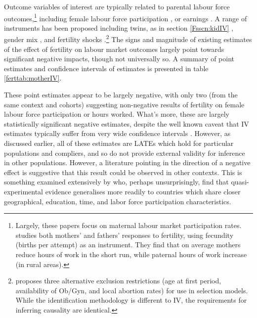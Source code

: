 Outcome variables of interest are typically related to parental labour 
force outcomes,\footnote{Largely, these papers focus on maternal labour
market participation rates. \citet{KimAassve2006} studies both mothers' and
fathers' responses to fertility, using fecundity (births per attempt) as an
instrument.  They find that on average mothers reduce hours of work in the short 
run, while paternal hours of work increase (in rural areas).} including female 
labour force participation \citep{AgueroMarks2008,AgueroMarks2011,ChunOh2002,
Caceres2008,AngristEvans1998}, or earnings \citep{Caceres2006,Hotzetal1997,
Jacobsenetal1999}.  A range of instruments has been proposed including twins,
as in section \ref{Fsscn:kidIV} \citep{RosenzweigWolpin1980b,Jacobsenetal1999,
BronarsGrogger1994}, gender mix \citep{AgueroMarks2008,AgueroMarks2011,
ChunOh2002}, and fertility shocks \citep{Miller2011,Cristia2008,
RosenzweigSchultz1987}.\footnote{\citet{Ribar1994} proposes three alternative
exclusion restrictions (age at first period, availability of Ob/Gyn, and local
abortion rates) for use in selection models.  While the identification 
methodology is different to IV, the requirements for inferring causality are 
identical.}  The signs and magnitude of existing estimates of the effect of 
fertility on labour market outcomes largely point towards significant negative 
impacts, though not universally so.  A summary of point estimates and 
confidence intervals of estimates is presented in table \ref{ferttab:motherIV}.



These point estimates appear to be largely negative, with only two (from the
same context and cohorts) suggesting non-negative results of fertility on
female labour force participation or hours worked.  What's more, these are
largely statistically significant negative estimates, despite the well known 
caveat that IV estimates typically suffer from very wide confidence intervals 
\citep{Angristetal2010}.  However, as discussed earlier, all of these
estimates are LATEs which hold for particular populations and compliers, and
so do not provide external validity for inference in other populations. 
However, a literature pointing in the direction of a negative effect is
suggestive that this result could be observed in other contexts.  This is
something examined extensively by \citet{Deheijaetal2015} who, perhaps
unsurprisingly, find that quasi-experimental evidence generalises more
readily to countries which share closer geographical, education, time, 
and labor force participation characteristics.

